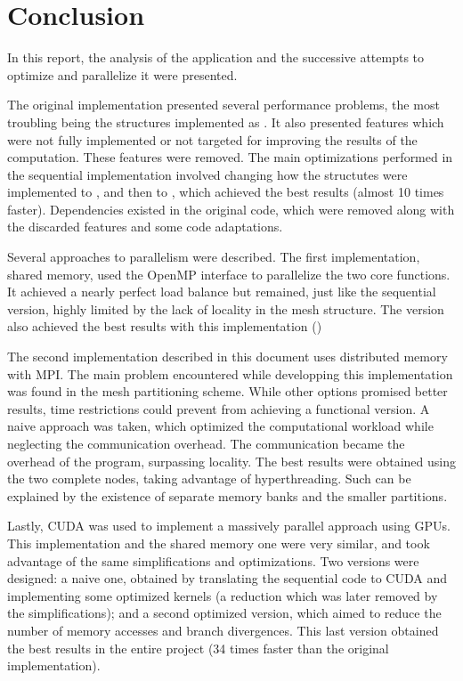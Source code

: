 \section{Conclusion}
\label{sec:conclusion}

In this report, the analysis of the \polu application and the successive attempts to optimize and parallelize it were presented.

The original implementation presented several performance problems, the most troubling being the structures implemented as \aop. It also presented features which were not fully implemented or not targeted for improving the results of the computation. These features were removed. The main optimizations performed in the sequential implementation involved changing how the structutes were implemented to \aos, and then to \soa, which achieved the best results (almost 10 times faster).
Dependencies existed in the original code, which were removed along with the discarded features and some code adaptations.

Several approaches to parallelism were described. The first implementation, shared memory, used the OpenMP interface to parallelize the two core functions. It achieved a nearly perfect load balance but remained, just like the sequential version, highly limited by the lack of locality in the mesh structure. The \soa version also achieved the best results with this implementation ()


The second implementation described in this document uses distributed memory with MPI. The main problem encountered while developping this implementation was found in the mesh partitioning scheme. While other options promised better results, time restrictions could prevent from achieving a functional version. A naive approach was taken, which optimized the computational workload while neglecting the communication overhead. The communication became the overhead of the program, surpassing locality. The best results were obtained using the two complete nodes, taking advantage of hyperthreading. Such can be explained by the existence of separate memory banks and the smaller partitions.

Lastly, CUDA was used to implement a massively parallel approach using GPUs. This implementation and the shared memory one were very similar, and took advantage of the same simplifications and optimizations. Two versions were designed: a naive one, obtained by translating the sequential code to CUDA and implementing some optimized kernels (a reduction which was later removed by the simplifications); and a second optimized version, which aimed to reduce the number of memory accesses and branch divergences. This last version obtained the best results in the entire project (34 times faster than the original implementation).

